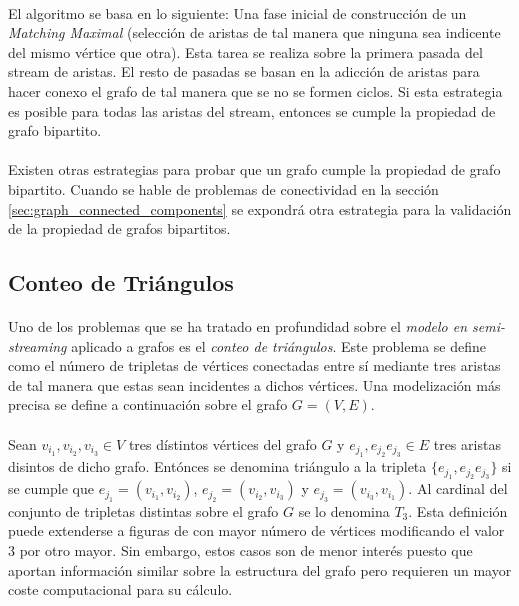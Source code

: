 \documentclass{subfiles}
\begin{document}
        \paragraph{}
        El algoritmo se basa en lo siguiente: Una fase inicial de construcción de un \emph{Matching Maximal} (selección de aristas de tal manera que ninguna sea indicente del mismo vértice que otra). Esta tarea se realiza sobre la primera pasada del stream de aristas. El resto de pasadas se basan en la adicción de aristas para hacer conexo el grafo de tal manera que se no se formen ciclos. Si esta estrategia es posible para todas las aristas del stream, entonces se cumple la propiedad de grafo bipartito.

        \paragraph{}
        Existen otras estrategias para probar que un grafo cumple la propiedad de grafo bipartito. Cuando se hable de problemas de conectividad en la sección \ref{sec:graph_connected_components} se expondrá otra estrategia para la validación de la propiedad de grafos bipartitos.


      \subsection{Conteo de Triángulos}
      \label{sec:counting_triangles}

        \paragraph{}
        Uno de los problemas que se ha tratado en profundidad sobre el \emph{modelo en semi-streaming} aplicado a grafos es el \emph{conteo de triángulos}. Este problema se define como el número de tripletas de vértices conectadas entre sí mediante tres aristas de tal manera que estas sean incidentes a dichos vértices. Una modelización más precisa se define a continuación sobre el grafo $G=(V,E)$.

        \paragraph{}
        Sean $v_{i_1},v_{i_2},v_{i_3} \in V$ tres dístintos vértices del grafo $G$ y $e_{j_1}, e_{j_2} e_{j_3} \in E$ tres aristas disintos de dicho grafo. Entónces se denomina triángulo a la tripleta $\{e_{j_1}, e_{j_2} e_{j_3}\}$ si se cumple que $e_{j_1} = (v_{i_1},v_{i_2})$, $e_{j_2} = (v_{i_2},v_{i_3})$ y $e_{j_3} = (v_{i_3},v_{i_1})$. Al cardinal del conjunto de tripletas distintas sobre el grafo $G$ se lo denomina $T_3$. Esta definición puede extenderse a figuras de con mayor número de vértices modificando el valor $3$ por otro mayor. Sin embargo, estos casos son de menor interés puesto que aportan información similar sobre la estructura del grafo pero requieren un mayor coste computacional para su cálculo.
\end{document}
